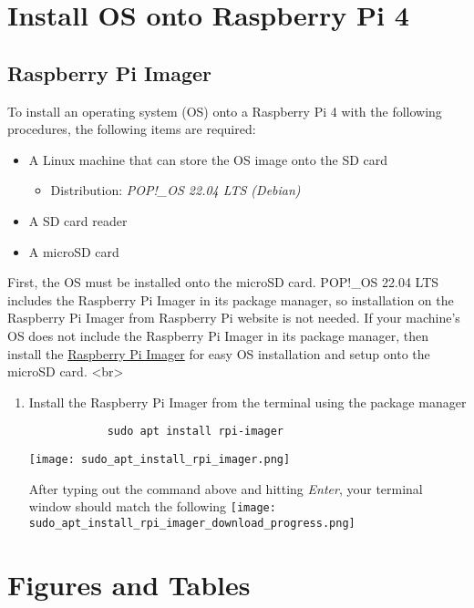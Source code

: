 \documentclass[journal]{IEEEtran}
\begin{document}
    \appendices
    \section{Install OS onto Raspberry Pi 4}
    \subsection{Raspberry Pi Imager}
    To install an operating system (OS) onto a Raspberry Pi 4 with the following procedures, the following items are required:
    \begin{itemize}
        \item A Linux machine that can store the OS image onto the SD card
        \begin{itemize}
            \item Distribution: \textit{POP!_OS 22.04 LTS (Debian)}
        \end{itemize}
        \item A SD card reader
        \item A microSD card
    \end{itemize}
    First, the OS must be installed onto the microSD card. POP!_OS 22.04 LTS includes the Raspberry Pi Imager in its package manager, so installation on the Raspberry Pi Imager from Raspberry Pi website is not needed. If your machine's OS does not include the Raspberry Pi Imager in its package manager, then install the \hyperlink{https://www.raspberrypi.com/software/}{Raspberry Pi Imager} for easy OS installation and setup onto the microSD card. <br>
    \begin{enumerate}
        \item Install the Raspberry Pi Imager from the terminal using the package manager
        \begin{verbatim}
            sudo apt install rpi-imager
        \end{verbatim}
        \texttt{[image: sudo\_apt\_install\_rpi\_imager.png]}

        After typing out the command above and hitting \textit{Enter}, your terminal window should match the following
        \texttt{[image: sudo\_apt\_install\_rpi\_imager\_download\_progress.png]}
    \end{enumerate}
    \section{Figures and Tables}
\end{document}
